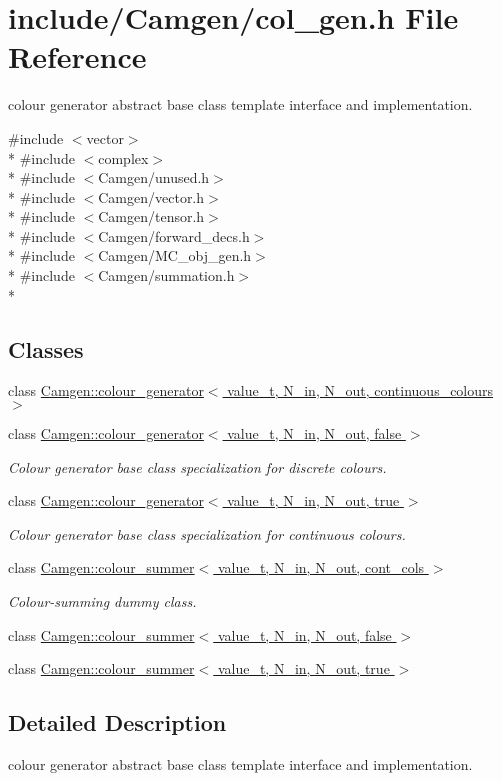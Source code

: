 \hypertarget{a00593}{\section{include/\-Camgen/col\-\_\-gen.h File Reference}
\label{a00593}
}


colour generator abstract base class template interface and implementation.  


{\ttfamily \#include $<$vector$>$}\\*
{\ttfamily \#include $<$complex$>$}\\*
{\ttfamily \#include $<$Camgen/unused.\-h$>$}\\*
{\ttfamily \#include $<$Camgen/vector.\-h$>$}\\*
{\ttfamily \#include $<$Camgen/tensor.\-h$>$}\\*
{\ttfamily \#include $<$Camgen/forward\-\_\-decs.\-h$>$}\\*
{\ttfamily \#include $<$Camgen/\-M\-C\-\_\-obj\-\_\-gen.\-h$>$}\\*
{\ttfamily \#include $<$Camgen/summation.\-h$>$}\\*
\subsection*{Classes}
\begin{DoxyCompactItemize}
\item 
class \hyperlink{a00082}{Camgen\-::colour\-\_\-generator$<$ value\-\_\-t, N\-\_\-in, N\-\_\-out, continuous\-\_\-colours $>$}
\item 
class \hyperlink{a00083}{Camgen\-::colour\-\_\-generator$<$ value\-\_\-t, N\-\_\-in, N\-\_\-out, false $>$}
\begin{DoxyCompactList}\small\item\em Colour generator base class specialization for discrete colours. \end{DoxyCompactList}\item 
class \hyperlink{a00084}{Camgen\-::colour\-\_\-generator$<$ value\-\_\-t, N\-\_\-in, N\-\_\-out, true $>$}
\begin{DoxyCompactList}\small\item\em Colour generator base class specialization for continuous colours. \end{DoxyCompactList}\item 
class \hyperlink{a00092}{Camgen\-::colour\-\_\-summer$<$ value\-\_\-t, N\-\_\-in, N\-\_\-out, cont\-\_\-cols $>$}
\begin{DoxyCompactList}\small\item\em Colour-\/summing dummy class. \end{DoxyCompactList}\item 
class \hyperlink{a00093}{Camgen\-::colour\-\_\-summer$<$ value\-\_\-t, N\-\_\-in, N\-\_\-out, false $>$}
\item 
class \hyperlink{a00094}{Camgen\-::colour\-\_\-summer$<$ value\-\_\-t, N\-\_\-in, N\-\_\-out, true $>$}
\end{DoxyCompactItemize}


\subsection{Detailed Description}
colour generator abstract base class template interface and implementation. 